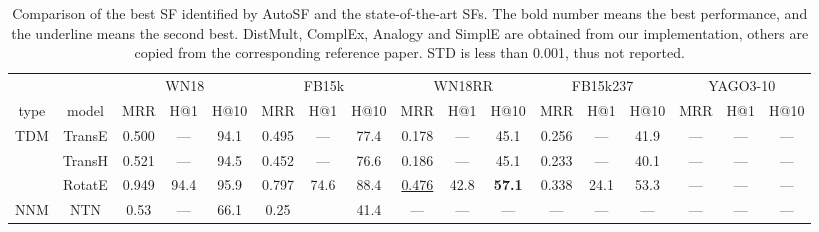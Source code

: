 \documentclass[conference]{IEEEtran}
\begin{document}
\begin{table*}[ht]
	\caption{Comparison of the best SF identified by AutoSF and the state-of-the-art SFs. 
		The bold number means the best performance, and the underline  means the second best. 
		DistMult, ComplEx, Analogy and SimplE are obtained from our implementation,
		others are copied from the corresponding reference paper.
		STD is less than 0.001, thus not reported.}
	\vspace{-9px}
	\label{tb:comparison}
	\centering
\begin{tabular}{c|c|ccc|ccc|ccc|ccc|ccc}
		\hline
		&                                         &      \multicolumn{3}{c|}{WN18}       &     \multicolumn{3}{c|}{FB15k}      &     \multicolumn{3}{c|}{WN18RR}      &    \multicolumn{3}{c|}{FB15k237}     &     \multicolumn{3}{c}{YAGO3-10}     \\ \cline{3-17}
		type &                  model                  &        MRR      & H@1  &       H@10       &       MRR       & H@1  &       H@10       &        MRR        & H@1 &       H@10       &        MRR       & H@1  &       H@10       &        MRR       & H@1  &       H@10       \\ \hline
		TDM  &    TransE \cite{zhang2018nscaching}     &       0.500  &   ---      &       94.1       &      0.495     &      ---    &       77.4       &       0.178    &   ---        &       45.1     &    0.256       &  ---      &       41.9       &         ---              &   ---     &        ---         \\
		&    TransH \cite{zhang2018nscaching}     &       0.521     & ---   &       94.5       &      0.452    &      ---     &       76.6       &       0.186     &    ---      &       45.1       &       0.233     &      ---    &       40.1       &         ---        &      ---   &        ---         \\
		&                 RotatE \cite{sun2019rotate}                 &       0.949     & 94.4   &       95.9       &      0.797      &  74.6  &       88.4       &       \underline{0.476}    &    42.8   &       \textbf{57.1}       &       0.338  &  24.1   &       53.3       &        ---      &     ---     &       ---        \\ \hline\hline
		NNM  &      NTN \cite{yang2014embedding}       &       0.53       &     ---    &       66.1       &       0.25       &        &       41.4       &         ---       &     ---     &        ---         &     ---           &    ---      &        ---           &         ---        &     ---        &        ---         \\

\end{tabular}
\end{table*}
\end{document}
